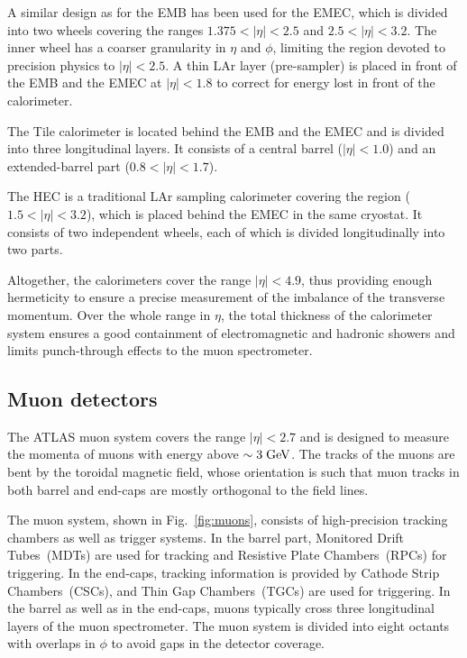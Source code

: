 A similar design as for the EMB has been used for the EMEC, 
which is divided into two wheels covering the ranges \mbox{$1.375 < |\eta| < 2.5$}
and \mbox{$2.5 < |\eta| < 3.2$}.
The inner wheel has a coarser granularity in $\eta$ and $\phi$, 
limiting the region devoted to precision physics to \mbox{$|\eta| < 2.5$}.
A thin LAr layer (pre-sampler) is placed in front of the EMB and the
EMEC at \mbox{$|\eta| < 1.8$} to correct for energy lost in front of the calorimeter.

The Tile calorimeter is located behind the EMB and the EMEC and is divided into three longitudinal layers.
It consists of a central barrel (\mbox{$|\eta| < 1.0$}) and an extended-barrel part (\mbox{$0.8 < |\eta| < 1.7$}).

The HEC is a traditional LAr sampling calorimeter covering the region (\mbox{$1.5 < |\eta| < 3.2$}), which is placed behind the EMEC in the same
cryostat.
It consists of two independent wheels, each of which is divided longitudinally into two parts.

Altogether, the calorimeters cover the range \mbox{$|\eta| < 4.9$},
thus providing enough hermeticity to ensure a precise measurement
of the imbalance of the transverse momentum.
Over the whole range in $\eta$, the total thickness of the calorimeter
system ensures a good containment of
electromagnetic and hadronic showers and limits punch-through effects to the muon spectrometer.

\subsection{Muon detectors}
\label{sec:muonspectrometer}

The ATLAS muon system covers the range \mbox{$|\eta| < 2.7$}
and is designed to measure the momenta of muons with energy 
above \mbox{$\sim 3 \; \mathrm{GeV}$}.
The tracks of the muons are bent by the toroidal magnetic field,
whose orientation is such that muon tracks in both barrel and end-caps 
are mostly orthogonal to the field lines.

The muon system, shown in Fig.~\ref{fig:muons}, consists of high-precision tracking chambers as well as trigger systems.
In the barrel part, Monitored Drift Tubes~(MDTs) are used for tracking and Resistive Plate Chambers~(RPCs) for triggering.
In the end-caps, tracking information is provided by Cathode Strip Chambers~(CSCs), and Thin Gap Chambers~(TGCs) are used for triggering.
In the barrel as well as in the end-caps, muons typically cross three longitudinal layers of the muon spectrometer.
The muon system is divided into eight octants with overlaps in $\phi$ to avoid gaps in the detector coverage.

